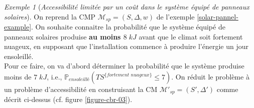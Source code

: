 \documentclass[12pt,a4paper]{report}
\theoremstyle{definition}%
\theoremstyle{remark}
\newtheorem{example}{Exemple}[chapter]
\newcommand{\ie}{i.e., }
\newcommand{\cf}{cf. }
\newcommand{\pr}{\mathbb{P}}
\begin{document}
\begin{example}[\textit{Accessibilité limitée par un coût dans le système équipé de panneaux solaires}]
	On reprend la CMP $\mathcal{M}_{sp} = (S, \Delta, w)$ de l'exemple \ref{solar-pannel-example}.
	On souhaite connaitre la probabilité que le système équipé de panneaux solaires produise \textbf{au moins $8 \; kJ$} avant que le climat soit fortement nuageux, en supposant que l'installation commence à produire l'énergie un jour ensoleillé.\\
	Pour ce faire, on va d'abord déterminer la probabilité que le système produise moins de $7\; kJ$, \ie $\pr_{\textit{ensoleillé}}(TS^{\{ \textit{fortement nuageux} \}} \leq 7)$. On réduit le problème à un problème d'accessibilité en construisant la CM $\mathcal{M'}_{sp} = (S', \Delta')$ comme décrit ci-dessus (\cf figure \ref{figure-cbr-03}).


\end{example}
\end{document}

